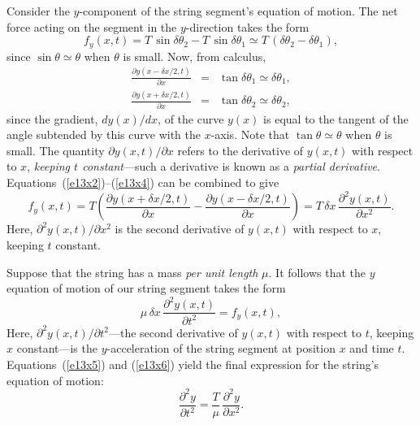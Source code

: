 Consider the $y$-component of the string segment's equation of motion. The net force
acting on the segment in the $y$-direction takes the form
\begin{equation}\label{e13x2}
f_y(x,t) = T\,\sin\delta\theta_2 - T\,\sin\delta\theta_1 \simeq T\,(\delta\theta_2-\delta\theta_1),
\end{equation}
since $\sin\theta\simeq \theta$ when $\theta$ is small. Now, from calculus,
\begin{eqnarray}\label{e13x3}
\frac{\partial y(x-\delta x/2,t)}{\partial x}&=& \tan\delta\theta_1\simeq \delta\theta_1,\\[0.5ex]
\frac{\partial y(x+\delta x/2,t)}{\partial x}&=& \tan\delta\theta_2\simeq \delta\theta_2,\label{e13x4}
\end{eqnarray}
since the gradient, $dy(x)/dx$, of the curve $y(x)$ is equal to
the tangent of the angle subtended by this curve with the $x$-axis. Note that $\tan\theta\simeq \theta$
when $\theta$ is small. The quantity $\partial y(x,t)/\partial x$ refers to the derivative of $y(x,t)$
with respect to $x$, {\em keeping $t$  constant}---such a derivative is known as a {\em partial
derivative}. Equations~(\ref{e13x2})--(\ref{e13x4}) can be combined to give
\begin{equation}\label{e13x5}
f_y(x,t) = T\left(\frac{\partial y(x+\delta x/2,t)}{\partial x}-\frac{\partial y(x-\delta x/2,t)}{\partial x}
\right)= T\,\delta x\,\frac{\partial^2 y(x,t)}{\partial x^2}.
\end{equation}
Here, $\partial^2 y(x,t)/\partial x^2$ is the second derivative of $y(x,t)$ with respect to $x$,
keeping $t$ constant.

Suppose that the string has a mass {\em per unit length} $\mu$. It follows that the $y$ equation of
motion of our string segment takes the form
\begin{equation}\label{e13x6}
\mu\,\delta x\,\frac{\partial^2 y(x,t)}{\partial t^2} = f_y (x,t),
\end{equation}
Here, $\partial^2 y(x,t)/\partial t^2$---the second derivative of $y(x,t)$ with respect to $t$,
keeping $x$ constant---is the $y$-acceleration of the string segment at position $x$ and time $t$. 
Equations~(\ref{e13x5}) and (\ref{e13x6}) yield the final expression for the string's equation of motion:
\begin{equation}\label{e13x7}
\frac{\partial^2 y}{\partial t^2}=\frac{T}{\mu}\,\frac{\partial^2 y}{\partial x^2}.
\end{equation}

